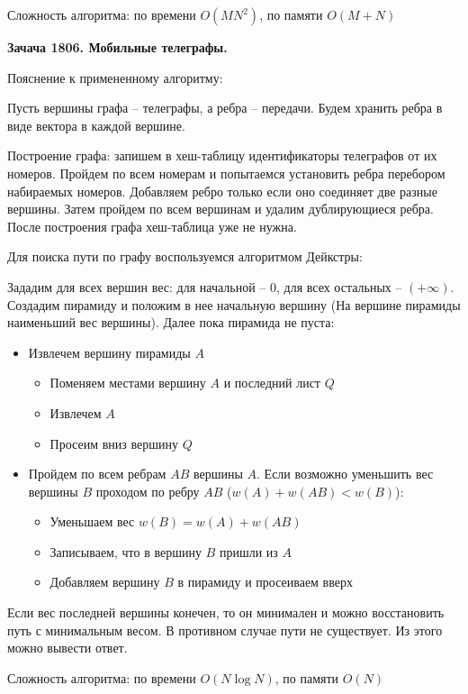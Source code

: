\documentclass[12pt,a4paper]{article}
\begin{document}
    Сложность алгоритма: по времени $O(MN^2)$, по памяти $O(M+N)$

    \bigskip

    \textbf{Зачача 1806. Мобильные телеграфы.}

    Пояснение к примененному алгоритму:

    Пусть вершины графа -- телеграфы, а ребра -- передачи.
    Будем хранить ребра в виде вектора в каждой вершине.

    Построение графа: запишем в хеш-таблицу идентификаторы телеграфов от их номеров.
    Пройдем по всем номерам и попытаемся установить ребра перебором набираемых номеров.
    Добавляем ребро только если оно соединяет две разные вершины.
    Затем пройдем по всем вершинам и удалим дублирующиеся ребра.
    После построения графа хеш-таблица уже не нужна.

    Для поиска пути по графу воспользуемся алгоритмом Дейкстры:

    Зададим для всех вершин вес: для начальной -- $0$, для всех остальных -- $(+\infty)$.
    Создадим пирамиду и положим в нее начальную вершину
    (На вершине пирамиды наименьший вес вершины).
    Далее пока пирамида не пуста:
    \begin{itemize}
        \item Извлечем вершину пирамиды $A$
        \begin{itemize}
            \item Поменяем местами вершину $A$ и последний лист $Q$
            \item Извлечем $A$
            \item Просеим вниз вершину $Q$
        \end{itemize}
        \item Пройдем по всем ребрам $AB$ вершины $A$.
        Если возможно уменьшить вес вершины $B$ проходом по ребру $AB$ ($w(A)+w(AB)<w(B)$):
        \begin{itemize}
            \item Уменьшаем вес $w(B)=w(A)+w(AB)$
            \item Записываем, что в вершину $B$ пришли из $A$
            \item Добавляем вершину $B$ в пирамиду и просеиваем вверх
        \end{itemize}
    \end{itemize}

    Если вес последней вершины конечен, то он минимален и можно восстановить путь с минимальным весом.
    В противном случае пути не существует.
    Из этого можно вывести ответ.

    Сложность алгоритма: по времени $O(N\log N)$, по памяти $O(N)$
\end{document}
